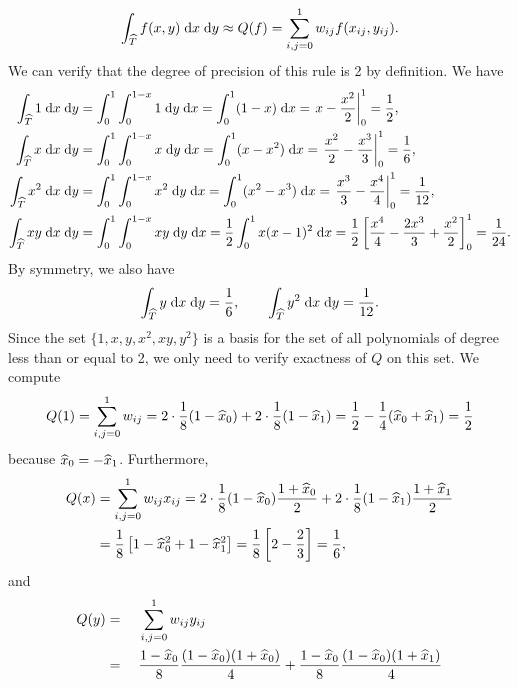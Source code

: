 \documentclass{homework}
\begin{document}
\begin{alphaparts}
		\begin{equation*}
			\int_{\widehat{T}} f(x,y)\;\text{d} x \;\text{d} y \approx Q(f) = \sum_{i,j=0}^1w_{ij}f(x_{ij}, y_{ij}).
		\end{equation*}
		We can verify that the degree of precision of this rule is 2 by definition. We have
		\begin{align*}
			\int_{\widehat{T}} 1\;\text{d} x\;\text{d} y &= \int_0^1\int_0^{1-x}1\;\text{d} y \;\text{d} x = \int_0^1(1-x)\;\text{d} x = \left.x-\frac{x^2}{2}\right|_0^1 = \frac{1}{2}, \\
			\int_{\widehat{T}} x\;\text{d} x \;\text{d} y &= \int_0^1\int_0^{1-x}x\;\text{d} y \;\text{d} x = \int_0^1(x-x^2)\;\text{d} x = \left.\frac{x^2}{2} - \frac{x^3}{3}\right|_0^1 = \frac{1}{6}, \\
			\int_{\widehat{T}}x^2\;\text{d} x\;\text{d} y &= \int_0^1\int_0^{1-x}x^2\;\text{d} y\;\text{d} x = \int_0^1(x^2-x^3)\;\text{d} x = \left.\frac{x^3}{3} - \frac{x^4}{4}\right|_0^1 = \frac{1}{12}, \\
			\int_{\widehat{T}}xy\;\text{d} x\;\text{d} y &= \int_0^1\int_0^{1-x}xy\;\text{d} y\;\text{d} x = \frac{1}{2}\int_0^1x(x-1)^2\;\text{d} x = \frac{1}{2}\left[\frac{x^4}{4} - \frac{2x^3}{3} + \frac{x^2}{2}\right]_0^1 = \frac{1}{24}.
		\end{align*}
		By symmetry, we also have
		\begin{equation*}
			\int_{\widehat{T}}y\;\text{d} x \;\text{d} y = \frac{1}{6}, \qquad \int_{\widehat{T}}y^2\;\text{d} x \;\text{d} y = \frac{1}{12}.
		\end{equation*}
		Since the set $\{1,x,y,x^2,xy,y^2\}$ is a basis for the set of all polynomials of degree less than or equal to 2, we only need to verify exactness of $Q$ on this set. We compute
		\begin{equation*}
			Q(1) = \sum_{i,j=0}^1w_{ij} = 2\cdot\frac{1}{8}(1-\widehat{x}_0) + 2\cdot\frac{1}{8}(1-\widehat{x}_1) = \frac{1}{2} - \frac{1}{4}(\widehat{x}_0+\widehat{x}_1) = \frac{1}{2}
		\end{equation*}
		because $\widehat{x}_0 = -\widehat{x}_1$. Furthermore,
		\begin{align*}
			Q(x) &= \sum_{i,j=0}^1w_{ij}x_{ij} = 2\cdot\frac{1}{8}(1-\widehat{x}_0)\frac{1+\widehat{x}_0}{2} + 2\cdot\frac{1}{8}(1-\widehat{x}_1)\frac{1+\widehat{x}_1}{2} \\
			&= \frac{1}{8}\left[1 - \widehat{x}_0^2 + 1-\widehat{x}_1^2\right] = \frac{1}{8}\left[2 - \frac{2}{3}\right] = \frac{1}{6},
		\end{align*}
		and
		\begin{alignat*}{2}
			Q(y) &{}={} &&\sum_{i,j=0}^1w_{ij}y_{ij}\\
			&{}={}&&\frac{1-\xh_0}{8}\frac{(1-\xh_0)(1+\xh_0)}{4} + \frac{1-\xh_0}{8}\frac{(1-\xh_0)(1+\xh_1)}{4} \\

\end{alignat*}
\end{alphaparts}
\end{document}

